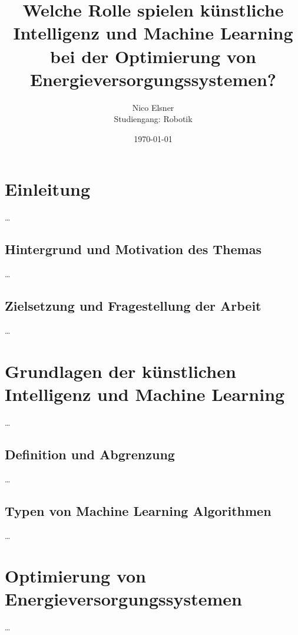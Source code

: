 \documentclass[
11pt, 
a4paper,
DIV = 14,
twoside,
twocolumn, %
parskip =half, %
headsepline, %
openright, %
]{scrreprt}
\begin{document}
	
	\title{Welche Rolle spielen künstliche Intelligenz und Machine Learning bei der Optimierung von Energieversorgungssystemen?}
	\author{Nico Elsner\\
		Studiengang: Robotik}
	\date{\today}
	\maketitle

	\clearpage
	\begingroup
	  \pagestyle{empty}
	  \renewcommand*\chapterpagestyle{empty}
	  \tableofcontents 
	\clearpage
	\endgroup
	\chapter{Einleitung}
	\setcounter{page}{1}
	\ldots
	\section{Hintergrund und Motivation des Themas}
	\ldots
	\section{Zielsetzung und Fragestellung der Arbeit}
	\ldots


	\chapter{Grundlagen der künstlichen Intelligenz und Machine Learning}
	\ldots
	\section{Definition und Abgrenzung}
	\ldots
	\section{Typen von Machine Learning Algorithmen}
	\ldots


	\chapter{Optimierung von Energieversorgungssystemen}
	\ldots
\end{document}
